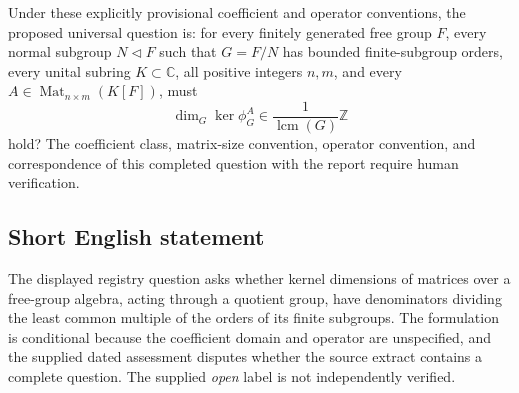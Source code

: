\documentclass[11pt]{article}
\newcommand{\Z}{\mathbb{Z}}
\newcommand{\C}{\mathbb{C}}
\begin{document}
Under these explicitly provisional coefficient and operator conventions, the proposed universal question is: for every finitely generated free group \(F\), every normal subgroup \(N\triangleleft F\) such that \(G=F/N\) has bounded finite-subgroup orders, every unital subring \(K\subset\C\), all positive integers \(n,m\), and every \(A\in\operatorname{Mat}_{n\times m}(K[F])\), must
\[
\dim_G\ker\phi_G^A\in\frac{1}{\operatorname{lcm}(G)}\Z
\]
hold? The coefficient class, matrix-size convention, operator convention, and correspondence of this completed question with the report require human verification.
\subsection{Short English statement}
The displayed registry question asks whether kernel dimensions of matrices over a free-group algebra, acting through a quotient group, have denominators dividing the least common multiple of the orders of its finite subgroups. The formulation is conditional because the coefficient domain and operator are unspecified, and the supplied dated assessment disputes whether the source extract contains a complete question. The supplied \emph{open} label is not independently verified.
\end{document}

